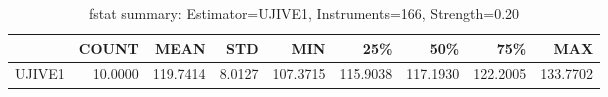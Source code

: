\begin{table}[ht]
\centering
\caption{fstat summary: Estimator=UJIVE1, Instruments=166, Strength=0.20}
\begin{tabular}{lrrrrrrrr}
\toprule
 & COUNT & MEAN & STD & MIN & 25\% & 50\% & 75\% & MAX \\
\midrule
UJIVE1 & 10.0000 & 119.7414 & 8.0127 & 107.3715 & 115.9038 & 117.1930 & 122.2005 & 133.7702 \\
\bottomrule
\end{tabular}
\end{table}
